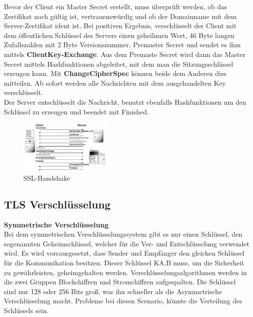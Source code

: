 \documentclass[11pt]{scrartcl}
\begin{document}
Bevor der Client ein Master Secret erstellt, muss überprüft werden, ob das Zertifikat noch gültig ist, vertrauenswürdig und ob der Domainname mit dem Server-Zertifikat ident ist. Bei positiven Ergebnis, verschlüsselt der Client mit dem öffentlichen Schlüssel des Servers einen geheihmen Wert, 46 Byte langen Zufallszahlen mit 2 Byte Versionsnummer, Premaster Secret und sendet es ihm mittels \textbf{ClientKey-Exchange}. Aus dem Premaste Secret wird dann das Master Secret mittels Hashfunktionen abgeleitet, mit dem man die Sitzungsschlüssel erzeugen kann. Mit \textbf{ChangeCipherSpec} können beide dem Anderen dies mitteilen. Ab sofort werden alle Nachrichten mit dem ausgehandelten Key verschlüsselt.\\
Der Server entschlüsselt die Nachricht, benutzt ebenfalls Hashfunktionen um den Schlüssel zu erzeugen und beendet mit Finished. \cite{1}\cite{6}
\begin{figure}[H]
\includegraphics[width=0.40\textwidth]{Bilder/TLS/SSL-Handshake}
	\caption{SSL-Handshake \cite{1}}
	\label{fig16}
\end{figure}

\subsection{TLS Verschlüsselung}
\label{sec:tls-encryption}

\textbf{Symmetrische Verschlüsselung}\\
Bei dem symmetrischen Verschlüsselungssystem gibt es nur einen Schlüssel, den sogenannten Geheimschlüssel, welcher für die Ver- und Entschlüsselung verwendet wird. Es wird vorrausgesetzt, dass Sender und Empfänger den gleichen Schlüssel für die Kommunikation besitzen. Dieser Schlüssel K{\scriptsize A,B} muss, um die Sicherheit zu gewährleisten, geheimgehalten werden. Verschlüsselungsalgorithmen werden in die zwei Gruppen Blockchiffren und Stromchiffren aufgespalten. Die Schlüssel sind nur 128 oder 256 Bits groß, was ihn schneller als die Asymmetrische Verschlüsselung macht. Probleme bei diesen Scenario, könnte die Verteilung des Schlüssels sein. \cite{4}\\
\end{document}
